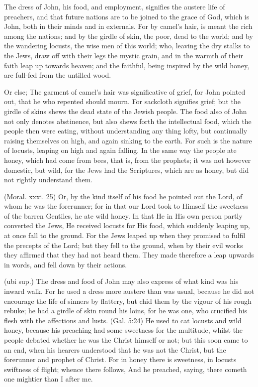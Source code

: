  The dress of John, his food, and employment, signifies the austere life of preachers, and that future nations are to be joined to the grace of God, which is John, both in their minds and in externals. For by camel’s hair, is meant the rich among the nations; and by the girdle of skin, the poor, dead to the world; and by the wandering locusts, the wise men of this world; who, leaving the dry stalks to the Jews, draw off with their legs the mystic grain, and in the warmth of their faith leap up towards heaven; and the faithful, being inspired by the wild honey, are full-fed from the untilled wood.

 Or else; The garment of camel’s hair was significative of grief, for John pointed out, that he who repented should mourn. For sackcloth signifies grief; but the girdle of skins shews the dead state of the Jewish people. The food also of John not only denotes abstinence, but also shews forth the intellectual food, which the people then were eating, without understanding any thing lofty, but continually raising themselves on high, and again sinking to the earth. For such is the nature of locusts, leaping on high and again falling. In the same way the people ate honey, which had come from bees, that is, from the prophets; it was not however domestic, but wild, for the Jews had the Scriptures, which are as honey, but did not rightly understand them.

 (Moral. xxxi. 25) Or, by the kind itself of his food he pointed out the Lord, of whom he was the forerunner; for in that our Lord took to Himself the sweetness of the barren Gentiles, he ate wild honey. In that He in His own person partly converted the Jews, He received locusts for His food, which suddenly leaping up, at once fall to the ground. For the Jews leaped up when they promised to fulfil the precepts of the Lord; but they fell to the ground, when by their evil works they affirmed that they had not heard them. They made therefore a leap upwards in words, and fell down by their actions.

 (ubi sup.) The dress and food of John may also express of what kind was his inward walk. For he used a dress more austere than was usual, because he did not encourage the life of sinners by flattery, but chid them by the vigour of his rough rebuke; he had a girdle of skin round his loins, for he was one, who crucified his flesh with the affections and lusts. (Gal. 5:24) He used to cat locusts and wild honey, because his preaching had some sweetness for the multitude, whilst the people debated whether he was the Christ himself or not; but this soon came to an end, when his hearers understood that he was not the Christ, but the forerunner and prophet of Christ. For in honey there is sweetness, in locusts swiftness of flight; whence there follows, And he preached, saying, there cometh one mightier than I after me.

